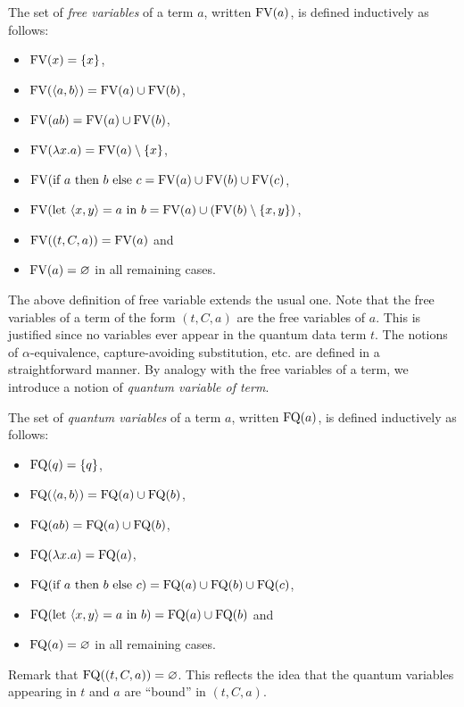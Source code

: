 \documentclass[twoside]{article}
\begin{document}
\begin{definition}
The set of \emph{free variables} of a term $a$, written $\FV(a)$, 
is defined inductively as follows:
\begin{itemize}
  \item $\FV(x)=\s{x}$,
  \item $\FV(\p{a,b})=\FV(a)\cup \FV(b)$,
  \item $\FV(ab)=\FV(a)\cup \FV(b)$,
  \item $\FV(\lambda x.a)=\FV(a)\setminus\s{x}$,
  \item $\FV(\ifthenelse{a}{b}{c} = \FV(a) \cup \FV(b) \cup \FV(c)$,
  \item $\FV(\letin{\p{x,y}}{a}{b}= \FV(a)\cup (\FV(b)\setminus \s{x,y})$,
  \item $\FV((t,C,a))= \FV(a)$ and
  \item $\FV(a)=\varnothing$ in all remaining cases.
\end{itemize}
\end{definition}

The above definition of free variable extends the usual one. Note 
that the free variables of a term of the form $(t,C,a)$ are the 
free variables of $a$. This is justified since no variables ever 
appear in the quantum data term $t$. The notions of $\alpha$-equivalence, 
capture-avoiding substitution, etc. are defined in a straightforward 
manner. By analogy with the free variables of a term, we introduce a 
notion of \emph{quantum variable of term}.

\begin{definition}
The set of \emph{quantum variables} of a term $a$, written $\FQ(a)$, is 
defined inductively as follows:
\begin{itemize}
  \item $\FQ(q)=\s{q}$,
  \item $\FQ(\p{a,b})=\FQ(a)\cup \FQ(b)$,
  \item $\FQ(ab)=\FQ(a)\cup \FQ(b)$,
  \item $\FQ(\lambda x.a)=\FQ(a)$,
  \item $\FQ(\ifthenelse{a}{b}{c}) = \FQ(a) \cup \FQ(b) \cup \FQ(c)$,
  \item $\FQ(\letin{\p{x,y}}{a}{b})= \FQ(a)\cup \FQ(b)$ and
  \item $\FQ(a)=\varnothing$ in all remaining cases.
\end{itemize}
\end{definition}

Remark that $\FQ((t,C,a))=\varnothing$. This reflects the idea that the 
quantum variables appearing in $t$ and $a$ are ``bound'' in $(t,C,a)$. 
\end{document}
